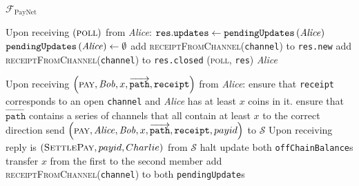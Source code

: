 \begin{functionality}{$\mathcal{F}_{\mathrm{PayNet}}$}
\begin{algorithmic}[1]
    \State Upon receiving $\left(\textsc{poll}\right)$ from \textit{Alice}:
    \Indent
      \State {}
      \State {} 
      \State $\mathtt{res.updates} \gets
      \mathtt{pendingUpdates}\left(\mathit{Alice}\right)$
      \State $\mathtt{pendingUpdates}\left(\mathit{Alice}\right) \gets \emptyset$
        \State add \textsc{receiptFromChannel}(\texttt{channel}) to
        \texttt{res.new}
      \EndFor
        \State add \textsc{receiptFromChannel}(\texttt{channel}) to
        \texttt{res.closed}
      \EndFor
      \State \Return (\textsc{poll}, \texttt{res}) \textit{Alice}
    \EndIndent
    \State

    \State Upon receiving $\left(\textsc{pay}, \mathit{Bob}, x,
    \overrightarrow{\mathtt{path}}, \mathtt{receipt}\right)$ from \textit{Alice}:
    \Indent
      \State ensure that \texttt{receipt} corresponds to an open
      \texttt{channel} and \textit{Alice} has at least $x$ coins in it.
      \State ensure that $\overrightarrow{\mathtt{path}}$ contains a series of
      channels that all contain at least $x$ to the correct direction 
      \State send $\left(\textsc{pay}, \mathit{Alice}, \mathit{Bob}, x,
      \overrightarrow{\mathtt{path}}, \mathtt{receipt}, payid\right)$ to $\mathcal{S}$
    \EndIndent
      \State Upon receiving reply is $\left(\textsc{SettlePay}, payid, Charlie\right)$ from $\mathcal{S}$
      \Indent
        \State halt 
      \Else
                \State update both \texttt{offChainBalance}s 
          \State transfer $x$ from the first to the second member 
          \State add \textsc{receiptFromChannel}(\texttt{channel})  to both
          \texttt{pendingUpdate}s
        \EndFor
      \EndIf
    \EndIndent
    \State


\end{algorithmic}
\end{functionality}
